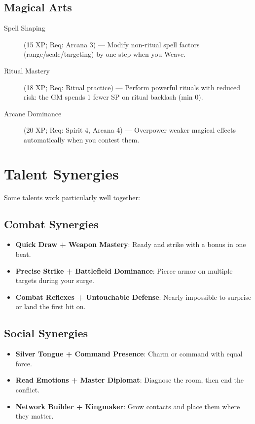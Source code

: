 \begin{multicols}{2}
\subsection*{Magical Arts}
\begin{description}
\item[Spell Shaping] (15 XP; Req: Arcana 3) --- Modify non-ritual spell factors (range/scale/targeting) by one step when you Weave.
\item[Ritual Mastery] (18 XP; Req: Ritual practice) --- Perform powerful rituals with reduced risk: the GM spends 1 fewer SP on ritual backlash (min 0).
\item[Arcane Dominance] (20 XP; Req: Spirit 4, Arcana 4) --- Overpower weaker magical effects automatically when you contest them.
\end{description}

\section{Talent Synergies}

Some talents work particularly well together:

\subsection*{Combat Synergies}
\begin{itemize}
\item \textbf{Quick Draw + Weapon Mastery}: Ready and strike with a bonus in one beat.
\item \textbf{Precise Strike + Battlefield Dominance}: Pierce armor on multiple targets during your surge.
\item \textbf{Combat Reflexes + Untouchable Defense}: Nearly impossible to surprise or land the first hit on.
\end{itemize}

\subsection*{Social Synergies}
\begin{itemize}
\item \textbf{Silver Tongue + Command Presence}: Charm or command with equal force.
\item \textbf{Read Emotions + Master Diplomat}: Diagnose the room, then end the conflict.
\item \textbf{Network Builder + Kingmaker}: Grow contacts and place them where they matter.
\end{itemize}


\end{multicols}

